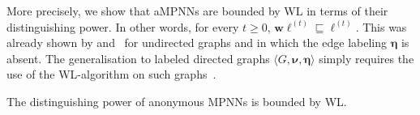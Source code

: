 More precisely, we show that aMPNNs are bounded by WL in terms of their distinguishing power. In other words, for every $t\geq 0$, $\mathbf{w}\pmb{\ell}^{(t)}\sqsubseteq \pmb{\ell}^{(t)}$. This was already shown  by \cite{XuHLJ19} and~\cite{grohewl} for undirected graphs and in which the edge labeling $\pmb{\eta}$ is absent. The generalisation to labeled directed graphs $\langle G,\pmb{\nu},\pmb{\eta}\rangle$ simply requires the use of the WL-algorithm on such graphs~\citep{}.
%
\begin{proposition}\label{prop:WL}
	The distinguishing power of anonymous MPNNs is bounded by WL.
\end{proposition}
